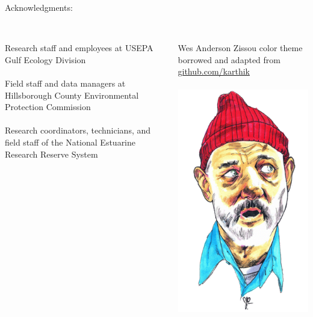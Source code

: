\documentclass[serif]{beamer}\usepackage[]{graphicx}\usepackage[]{color}
\begin{document}
\begin{frame}
\alert{Acknowledgments:}\\~\\
\begin{columns}
\begin{column}{0.6\textwidth}
{\footnotesize
Research staff and employees at USEPA Gulf Ecology Division \\~\\
Field staff and data managers at Hillsborough County Environmental Protection Commission\\~\\
Research coordinators, technicians, and field staff of the National Estuarine Research Reserve System}\\~\\
\end{column}
\begin{column}{0.3\textwidth}
\vspace{-0.2in}
\begin{center}
{\tiny
Wes Anderson Zissou color theme borrowed and adapted from \href{https://github.com/karthik/wesanderson}{github.com/karthik}\\~\\
\includegraphics[width=0.55\linewidth]{fig/zissou.png}\\~\\
\vspace{-0.15in}
}
\end{center}
\end{column}
\end{columns}
\end{frame}
\end{document}
